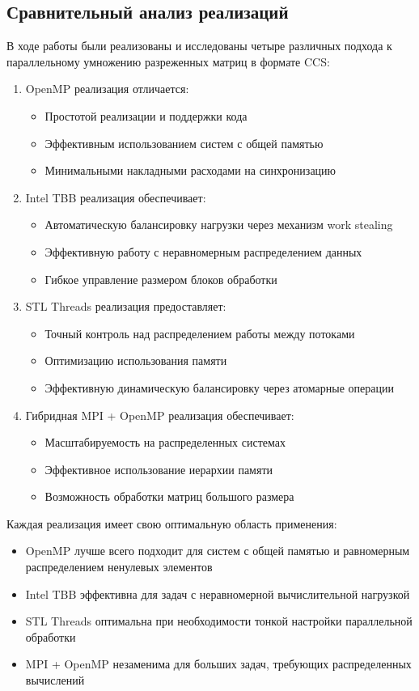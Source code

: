 \documentclass[12pt]{article}
\begin{document}
\subsection{Сравнительный анализ реализаций}
В ходе работы были реализованы и исследованы четыре различных подхода к параллельному умножению разреженных матриц в формате CCS:
\begin{enumerate}
\item OpenMP реализация отличается:
\begin{itemize}
\item Простотой реализации и поддержки кода
\item Эффективным использованием систем с общей памятью
\item Минимальными накладными расходами на синхронизацию
\end{itemize}
\item Intel TBB реализация обеспечивает:
\begin{itemize}
\item Автоматическую балансировку нагрузки через механизм work stealing
\item Эффективную работу с неравномерным распределением данных
\item Гибкое управление размером блоков обработки
\end{itemize}
\item STL Threads реализация предоставляет:
\begin{itemize}
\item Точный контроль над распределением работы между потоками
\item Оптимизацию использования памяти
\item Эффективную динамическую балансировку через атомарные операции
\end{itemize}
\item Гибридная MPI + OpenMP реализация обеспечивает:
\begin{itemize}
\item Масштабируемость на распределенных системах
\item Эффективное использование иерархии памяти
\item Возможность обработки матриц большого размера
\end{itemize}
\end{enumerate}
Каждая реализация имеет свою оптимальную область применения:
\begin{itemize}
\item OpenMP лучше всего подходит для систем с общей памятью и равномерным распределением ненулевых элементов
\item Intel TBB эффективна для задач с неравномерной вычислительной нагрузкой
\item STL Threads оптимальна при необходимости тонкой настройки параллельной обработки
\item MPI + OpenMP незаменима для больших задач, требующих распределенных вычислений
\end{itemize}
\end{document}
